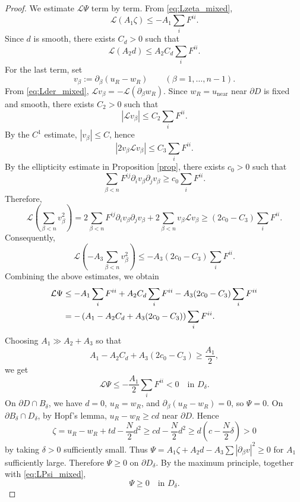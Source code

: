 \documentclass[reqno,a4paper]{amsart}
\numberwithin{equation}{section}
\begin{document}
\begin{proof}
		We estimate $\mathcal{L}\Psi$ term by term. From \eqref{eq:Lzeta_mixed},
		\[
		\mathcal{L}(A_1\zeta) \le -A_1\sum_i F^{ii}.
		\]
		Since $d$ is smooth, there exists $C_d>0$ such that
		\[
		\mathcal{L}(A_2d) \le A_2 C_d \sum_i F^{ii}.
		\]
		For the last term, set
		\[
		v_\beta:=\partial_\beta(u_R-w_R) \qquad (\beta=1,\dots,n-1).
		\]
		From \eqref{eq:Lder_mixed}, $\mathcal{L}v_\beta = -\mathcal{L}(\partial_\beta w_R)$. 
		Since $w_R=u_{\mathrm{near}}$ near $\partial D$ is fixed and smooth, there exists $C_2>0$ such that
		\[
		|\mathcal{L}v_\beta| \le C_2 \sum_i F^{ii}.
		\]
		By the $C^1$ estimate, $|v_\beta|\le C$, hence
		\[
		|2v_\beta \mathcal{L}v_\beta| \le C_3 \sum_i F^{ii}.
		\]
		By the ellipticity estimate in Proposition \ref{prop}, there exists $c_0>0$ such that
		\[
		\sum_{\beta<n} F^{ij}\partial_i v_\beta \partial_j v_\beta \ge c_0 \sum_i F^{ii}.
		\]
		Therefore,
		\[
		\mathcal{L}\left(\sum_{\beta<n}v_\beta^2\right)
		= 2\sum_{\beta<n}F^{ij}\partial_i v_\beta \partial_j v_\beta
		+ 2\sum_{\beta<n}v_\beta \mathcal{L}v_\beta
		\ge (2c_0 - C_3)\sum_i F^{ii}.
		\]
		Consequently,
		\[
		\mathcal{L}\left(-A_3\sum_{\beta<n}v_\beta^2\right)
		\le -A_3(2c_0 - C_3)\sum_i F^{ii}.
		\]
		Combining the above estimates, we obtain
		\begin{align}
			\mathcal{L}\Psi
			&\le -A_1 \sum_iF^{ii}
			+ A_2C_d\sum_i F^{ii}
			- A_3(2c_0 - C_3)\sum_i F^{ii} \notag \\
			&= -\left(A_1- A_2C_d + A_3(2c_0 - C_3)\right)\sum_i F^{ii}. \label{eq:LPsi_est_mixed}
		\end{align}
		Choosing $A_1\gg A_2+A_3$ so that
		\[
		A_1 - A_2C_d + A_3(2c_0 - C_3) \ge \frac{A_1}{2},
		\]
		we get
		\begin{equation}
			\mathcal{L}\Psi \le -\frac{A_1}{2}\sum_i F^{ii} < 0 \quad \text{in } D_\delta. \label{eq:LPsi_mixed}
		\end{equation}
		On $\partial D\cap B_\delta$, we have $d=0$, $u_R=w_R$, and $\partial_\beta(u_R-w_R)=0$, so $\Psi=0$. 
		On $\partial B_\delta\cap D_\delta$, by Hopf's lemma, $u_R-w_R\ge cd$ near $\partial D$. Hence
		\[
		\zeta = u_R-w_R+td-\frac{N}{2}d^2 \ge cd - \frac{N}{2}d^2 \ge d\left(c-\frac{N}{2}\delta\right)>0
		\]
		by taking $\delta>0$ sufficiently small. Thus $\Psi=A_1\zeta+A_2d-A_3\sum|\partial_\beta v|^2\ge0$ for $A_1$ sufficiently large. 
		Therefore $\Psi\ge0$ on $\partial D_\delta$. By the maximum principle, together with \eqref{eq:LPsi_mixed},
		\begin{equation}
			\Psi \ge 0 \quad \text{in } D_\delta. \label{eq:Psi_bound_mixed}

\end{equation}
\end{proof}
\end{document}
